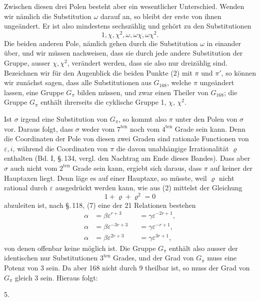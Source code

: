 Zwischen diesen drei Polen besteht aber ein wesentlicher Unterschied. Wenden wir nämlich die Substitution $\omega$ darauf an, so bleibt der erste von ihnen ungeändert. Er ist also mindestens sechszählig und gehört zu den Substitutionen
\[
1, \chi, \chi^2, \omega, \omega\chi, \omega\chi^2.
\]
Die beiden anderen Pole, nämlich
gehen durch die Substitution $\omega$ in einander über, und wir müssen nachweisen, dass sie durch jede andere Substitution der Gruppe, ausser $\chi, \chi^2$, verändert werden, dass sie also nur dreizählig sind. Bezeichnen wir für den Augenblick die beiden Punkte (2) mit $\pi$ und $\pi'$, so können wir zunächst sagen, dass alle Substitutionen aus $G_{168}$, welche $\pi$ ungeändert lassen, eine Gruppe $G_\pi$ bilden
müssen, und zwar einen Theiler von $G_{168}$; die Gruppe $G_\pi$ enthält ihrerseits die cyklische Gruppe 1, $\chi$, $\chi^2$.

Ist $\sigma$ irgend eine Substitution von $G_\pi$, so kommt also $\pi$ unter den Polen von $\sigma$ vor. Daraus folgt, dass $\sigma$ weder vom $7^{\mathrm{ten}}$ noch vom $4^{\mathrm{ten}}$ Grade sein kann. Denn die Coordinaten der Pole von diesen zwei Graden sind rationale Functionen von $\varepsilon, i$, während die Coordinaten von $\pi$ die davon unabhängige Irrationalität $\varrho$ enthalten (Bd. I, \S.\,134, vergl. den Nachtrag am Ende dieses Bandes). Dass aber $\sigma$ auch nicht vom $2^{\mathrm{ten}}$ Grade sein kann, ergiebt sich daraus, dass $\pi$ auf keiner der Hauptaxen liegt. Denn läge es auf einer Hauptaxe, so müsste, weil $\varrho$ nicht rational durch $\varepsilon$ ausgedrückt werden kann, wie aus (2) mittelst der Gleichung
\[
1 + \varrho + \varrho^2 = 0
\]
abzuleiten ist, nach \S.\,118, (7) eine der 21 Relationen bestehen
\[
\begin{aligned}
\alpha &= \beta\varepsilon^{r+3} &&= \gamma\varepsilon^{-2r+1}, \\
\alpha &= \beta\varepsilon^{-3r+3} &&= \gamma\varepsilon^{-r+1}, \\
\alpha &= \beta\varepsilon^{2r+3} &&= \gamma\varepsilon^{3r+1},
\end{aligned}
\]
von denen offenbar keine möglich ist. Die Gruppe $G_\pi$ enthält also ausser der identischen nur Substitutionen $3^{\mathrm{ten}}$ Grades, und der Grad von $G_\pi$ muss eine Potenz von 3 sein. Da aber 168 nicht durch 9 theilbar ist, so muss der Grad von $G_\pi$ gleich 3 sein. Hieraus folgt:

5. 
